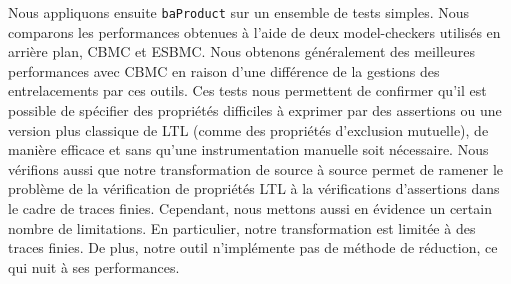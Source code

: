 Nous appliquons ensuite \texttt{baProduct} sur un ensemble de tests simples.
Nous comparons les performances obtenues à l'aide de deux model-checkers
utilisés en arrière plan, CBMC et ESBMC. Nous obtenons généralement des
meilleures performances avec CBMC en raison d'une différence de la gestions des
entrelacements par ces outils. Ces tests nous permettent de confirmer qu'il est
possible de spécifier des propriétés difficiles à exprimer par des assertions ou
une version plus classique de LTL (comme des propriétés d'exclusion mutuelle),
de manière efficace et sans qu'une instrumentation manuelle soit nécessaire.
Nous vérifions aussi que notre transformation de source à source permet de
ramener le problème de la vérification de propriétés LTL à la vérifications
d'assertions dans le cadre de traces finies. Cependant, nous mettons aussi en
évidence un certain nombre de limitations. En particulier, notre transformation
est limitée à des traces finies. De plus, notre outil n'implémente pas de
méthode de réduction, ce qui nuit à ses performances.